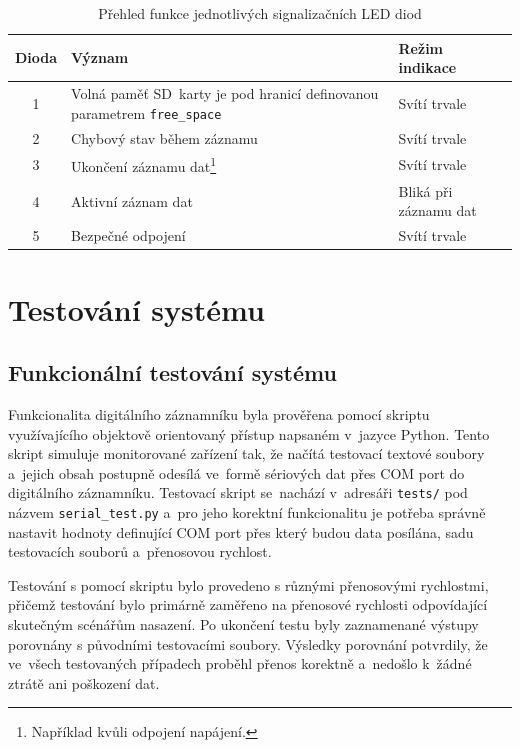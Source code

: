 \begin{table}[h]
    \centering
    \renewcommand{\arraystretch}{1.2}
    \begin{tabularx}{\linewidth}{|c|X|X|}
        \hline
        \textbf{Dioda} & \textbf{Význam} & \textbf{Režim indikace} \\
        \hline
        1 & Volná paměť SD~karty je pod hranicí definovanou parametrem \texttt{free\_space} & Svítí trvale \\
        \hline
        2 & Chybový stav během záznamu & Svítí trvale \\
        \hline
        3 & Ukončení záznamu dat\footnote{Například kvůli odpojení napájení.} & Svítí trvale \\
        \hline
        4 & Aktivní záznam dat & Bliká při záznamu dat \\
        \hline
        5 & Bezpečné odpojení & Svítí trvale \\
        \hline
    \end{tabularx}
    \caption{Přehled funkce jednotlivých signalizačních LED diod}
    \label{tab:signal_leds}
\end{table}
\chapter{Testování systému}
\label{testovani_systemu}

\section{Funkcionální testování systému}
Funkcionalita digitálního záznamníku byla prověřena pomocí skriptu využívajícího objektově
orientovaný přístup napsaném v~jazyce Python. Tento skript simuluje monitorované
zařízení tak, že načítá testovací textové soubory a~jejich obsah postupně odesílá ve~formě
sériových dat přes COM port do digitálního záznamníku. Testovací skript se~nachází v~adresáři
\texttt{tests/} pod názvem \texttt{serial\_test.py} a~pro jeho korektní funkcionalitu je potřeba
správně nastavit hodnoty definující COM port přes který budou data posílána, sadu testovacích
souborů a~přenosovou rychlost.

Testování s pomocí skriptu bylo provedeno s různými přenosovými rychlostmi, přičemž
testování bylo primárně zaměřeno na přenosové rychlosti odpovídající skutečným scénářům
nasazení. Po ukončení testu byly zaznamenané výstupy porovnány s původními testovacími
soubory. Výsledky porovnání potvrdily, že ve~všech testovaných případech proběhl přenos
korektně a~nedošlo k~žádné ztrátě ani poškození dat.

